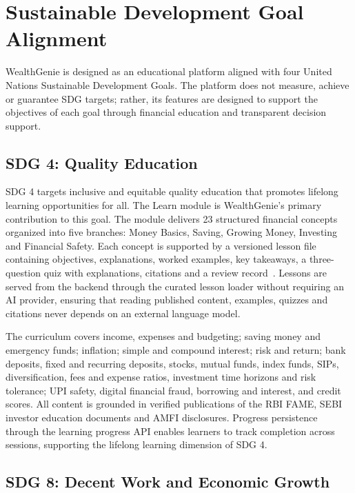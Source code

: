 \section{Sustainable Development Goal Alignment}

WealthGenie is designed as an educational platform aligned with four United Nations Sustainable Development Goals. The platform does not measure, achieve or guarantee SDG targets; rather, its features are designed to support the objectives of each goal through financial education and transparent decision support.

\subsection{SDG 4: Quality Education}

SDG 4 targets inclusive and equitable quality education that promotes lifelong learning opportunities for all. The Learn module is WealthGenie's primary contribution to this goal. The module delivers 23 structured financial concepts organized into five branches: Money Basics, Saving, Growing Money, Investing and Financial Safety. Each concept is supported by a versioned lesson file containing objectives, explanations, worked examples, key takeaways, a three-question quiz with explanations, citations and a review record~\cite{learning_content}. Lessons are served from the backend through the curated lesson loader without requiring an AI provider, ensuring that reading published content, examples, quizzes and citations never depends on an external language model.

The curriculum covers income, expenses and budgeting; saving money and emergency funds; inflation; simple and compound interest; risk and return; bank deposits, fixed and recurring deposits, stocks, mutual funds, index funds, SIPs, diversification, fees and expense ratios, investment time horizons and risk tolerance; UPI safety, digital financial fraud, borrowing and interest, and credit scores. All content is grounded in verified publications of the RBI FAME, SEBI investor education documents and AMFI disclosures. Progress persistence through the learning progress API enables learners to track completion across sessions, supporting the lifelong learning dimension of SDG 4.

\subsection{SDG 8: Decent Work and Economic Growth}

